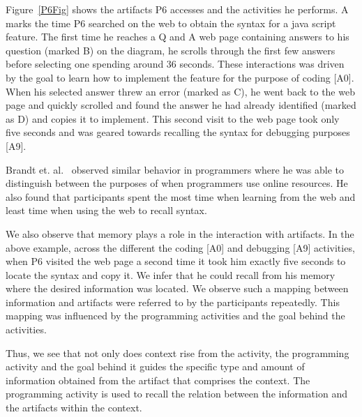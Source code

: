 Figure~\ref{P6Fig} shows the artifacts P6 accesses and the activities he performs. A marks the time P6 searched on the web to obtain the syntax for a java script feature. The first time he reaches a Q and A web page containing answers to his question (marked B) on the diagram, he scrolls through the first few answers before selecting one spending around 36 seconds. These interactions was driven by the goal to learn how to implement the feature for the purpose of coding [A0]. When his selected answer threw an error (marked as C), he went back to the web page and quickly scrolled and found the answer he had already identified (marked as D) and copies it to implement. This second visit to the web page took only five seconds and was geared towards recalling the syntax for debugging purposes [A9]. 

Brandt et. al.~\cite{Brandt:2009} observed similar behavior in programmers where he was able to distinguish between the purposes of when programmers use online resources. He also found that participants spent the most time when learning from the web and least time when using the web to recall syntax.


We also observe that memory plays a role in the interaction with artifacts. In the above example, across the different the coding [A0] and debugging [A9] activities, when P6 visited the web page a second time it took him exactly five seconds to locate the syntax and copy it. We infer that he could recall from his memory where the desired information was located. We observe such a mapping between information and artifacts were referred to by the participants repeatedly. This mapping was influenced by the programming activities and the goal behind the activities.


Thus, we see that not only does context rise from the activity, the programming activity and the goal behind it guides the specific type and amount of information obtained from the artifact that comprises the context. The programming activity is used to recall the relation between the information and the artifacts within the context.


